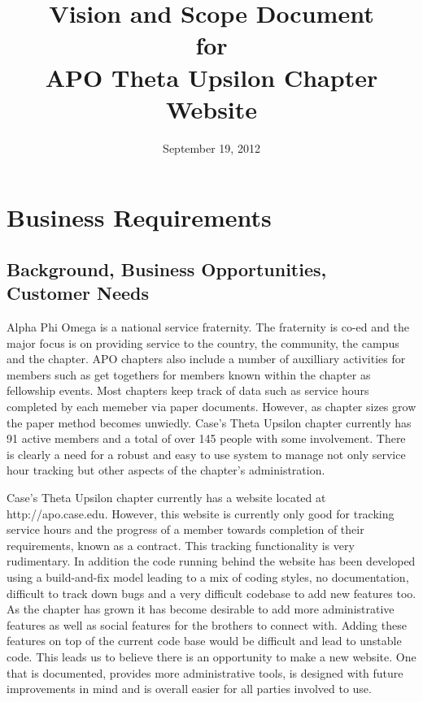 \documentclass[11pt,letterpaper,rotate]{article}
\title{Vision and Scope Document \\
for \\
APO Theta Upsilon Chapter Website}
\date{September 19, 2012}
\begin{document}
\maketitle
\newpage

\tableofcontents
\listoffigures

\newpage

\section{Business Requirements}


\subsection{Background, Business Opportunities, Customer Needs}

Alpha Phi Omega is a national service fraternity. The fraternity is co-ed and the major focus is on providing service to the country, the community, the campus and the chapter. APO chapters also include a number of auxilliary activities for members such as get togethers for members known within the chapter as fellowship events. Most chapters keep track of data such as service hours completed by each memeber via paper documents. However, as chapter sizes grow the paper method becomes unwiedly. Case's Theta Upsilon chapter currently has 91 active members and a total of over 145 people with some involvement. There is clearly a need for a robust and easy to use system to manage not only service hour tracking but other aspects of the chapter's administration.

Case's Theta Upsilon chapter currently has a website located at http://apo.case.edu. However, this website is currently only good for tracking service hours and the progress of a member towards completion of their requirements, known as a contract. This tracking functionality is very rudimentary. In addition the code running behind the website has been developed using a build-and-fix model leading to a mix of coding styles, no documentation, difficult to track down bugs and a very difficult codebase to add new features too. As the chapter has grown it has become desirable to add more administrative features as well as social features for the brothers to connect with. Adding these features on top of the current code base would be difficult and lead to unstable code. This leads us to believe there is an opportunity to make a new website. One that is documented, provides more administrative tools, is designed with future improvements in mind and is overall easier for all parties involved to use.
\end{document}

